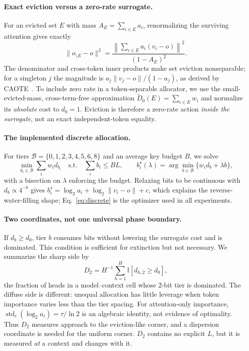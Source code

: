 \documentclass{article}
\theoremstyle{definition}
\begin{document}
\paragraph{Exact eviction versus a zero-rate surrogate.}
For an evicted set $E$ with mass $A_E=\sum_{i\in E}a_i$, renormalizing the surviving attention gives exactly
\begin{equation}
 \|o_{\setminus E}-o\|^2
 =\frac{\left\|\sum_{i\in E}a_i(v_i-o)\right\|^2}{(1-A_E)^2}.
 \label{eq:exact-eviction}
\end{equation}
The denominator and cross-token inner products make set eviction nonseparable; for a singleton $j$ the magnitude is $a_j\|v_j-o\|/(1-a_j)$, as derived by CAOTE~\citep{goel2025caote}.
To include zero rate in a token-separable allocator, we use the small-evicted-mass, cross-term-free approximation
$\widetilde D_0(E)=\sum_{i\in E}w_i$ and normalize its \emph{absolute} cost to $d_0=1$.  Eviction is therefore a zero-rate action \emph{inside the surrogate}, not an exact independent-token equality.

\paragraph{The implemented discrete allocation.}
For tiers $\mathcal B=\{0,1,2,3,4,5,6,8\}$ and an average key budget $B$, we solve
\begin{equation}
 \min_{b_i\in\mathcal B}\sum_i w_i d_{b_i}
 \quad\text{s.t.}\quad \sum_i b_i\le BL,
 \qquad
 b_i^\star(\lambda)=\arg\min_{b\in\mathcal B}\{w_i d_b+\lambda b\},
 \label{eq:discrete}
\end{equation}
with a bisection on $\lambda$ enforcing the budget.  Relaxing bits to be continuous with $d_b\propto4^{-b}$ gives $b_i^\star=\log_2a_i+\log_2\|v_i-o\|+c$, which explains the reverse-water-filling shape; Eq.~\ref{eq:discrete} is the optimizer used in all experiments.

\paragraph{Two coordinates, not one universal phase boundary.}
If $d_b\ge d_0$, tier $b$ consumes bits without lowering the surrogate cost and is dominated.  This condition is sufficient for extinction but not necessary.  We summarize the sharp side by
\begin{equation}
 D_2=H^{-1}\textstyle\sum_{h=1}^{H}\mathbb I[d_{h,2}\ge d_0],
 \label{eq:d2}
\end{equation}
the fraction of heads in a model--context cell whose 2-bit tier is dominated.  The diffuse side is different: unequal allocation has little leverage when token importance varies less than the tier spacing.  For attention-only importance, $\operatorname{std}_i(\log_2a_i)=\tau/\ln2$ is an algebraic identity, not evidence of optimality.  Thus $D_2$ measures approach to the eviction-like corner, and a dispersion coordinate is needed for the uniform corner.  $D_2$ contains no explicit $L$, but it is measured \emph{at} a context and changes with it.
\end{document}
